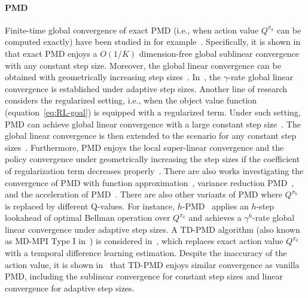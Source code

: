 \documentclass[10pt]{article}
\theoremstyle{plain}
\theoremstyle{definition}
\begin{document}
\paragraph{PMD} Finite-time global convergence  of exact PMD (i.e., when action value $Q^{\pi_k}$ can be computed exactly) have been studied in for example~\citet{Xiao_2022,Lan_2021,Johnson_Pike-Burke_Rebeschini_2023}. Specifically, it is shown in~\citet{Lan_2021,Xiao_2022} that exact PMD enjoys a $O({1}/{K})$ dimension-free global sublinear convergence with any constant step size. Moreover, the global linear convergence can be obtained with  geometrically increasing step sizes~\citep{Xiao_2022}. In~\citet{Johnson_Pike-Burke_Rebeschini_2023}, the $\gamma$-rate global linear convergence is established under adaptive step sizes. Another line of research considers the regularized setting, i.e., when the object value function (equation~\eqref{eq:RL-goal}) is equipped with a regularized term. Under such setting, PMD can achieve global linear convergence with a large constant step size~\citep{Lan_2021}. The global linear convergence is then extended to the scenario for any constant step sizes~\citep{Zhan_Cen_Huang_Chen_Lee_Chi_2021}. Furthermore, PMD enjoys the local super-linear convergence and the policy convergence under geometrically increasing the step sizes if the coefficient of regularization term decreases properly~\citep{Li_Zhao_Lan_2022}. There are also works investigating the convergence of PMD with function approximation~\citep{yuan2023general}, variance reduction PMD~\citep{Yang2019PolicyOW,huang2022bregman}, and the acceleration of PMD~\citep{chelu2024functional}.
There are also other variants  of PMD  where $Q^{\pi_k}$ is replaced by different Q-values. For instance, $h$-PMD~\citep{protopapas2024policy} applies an $h$-step lookahead of optimal Bellman operation over $Q^{\pi_k}$ and achieves a $\gamma^h$-rate global linear convergence under adaptive step sizes. %
A TD-PMD algorithm (also known as MD-MPI Type I in~\citet{Geist_Scherrer_Pietquin_2019}) is considered in~\citet{liu2025tdpmd}, which replaces exact action value $Q^{\pi_k}$ with a temporal difference learning estimation. Despite the inaccuracy of the action value, it is shown in~\citet{liu2025tdpmd} that TD-PMD enjoys similar convergence as vanilla PMD, including the sublinear convergence for constant step sizes and linear convergence for adaptive step sizes. 
\end{document}
